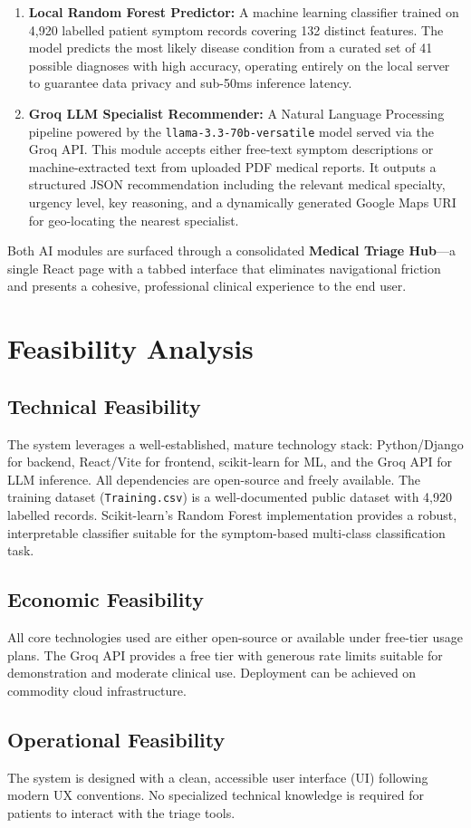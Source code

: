 \begin{enumerate}
    \item \textbf{Local Random Forest Predictor:} A machine learning classifier trained on 4,920 labelled patient symptom records covering 132 distinct features. The model predicts the most likely disease condition from a curated set of 41 possible diagnoses with high accuracy, operating entirely on the local server to guarantee data privacy and sub-50ms inference latency.

    \item \textbf{Groq LLM Specialist Recommender:} A Natural Language Processing pipeline powered by the \texttt{llama-3.3-70b-versatile} model served via the Groq API. This module accepts either free-text symptom descriptions or machine-extracted text from uploaded PDF medical reports. It outputs a structured JSON recommendation including the relevant medical specialty, urgency level, key reasoning, and a dynamically generated Google Maps URI for geo-locating the nearest specialist.
\end{enumerate}

Both AI modules are surfaced through a consolidated \textbf{Medical Triage Hub}---a single React page with a tabbed interface that eliminates navigational friction and presents a cohesive, professional clinical experience to the end user.

\section{Feasibility Analysis}

\subsection{Technical Feasibility}
The system leverages a well-established, mature technology stack: Python/Django for backend, React/Vite for frontend, scikit-learn for ML, and the Groq API for LLM inference. All dependencies are open-source and freely available. The training dataset (\texttt{Training.csv}) is a well-documented public dataset with 4,920 labelled records. Scikit-learn's Random Forest implementation provides a robust, interpretable classifier suitable for the symptom-based multi-class classification task.

\subsection{Economic Feasibility}
All core technologies used are either open-source or available under free-tier usage plans. The Groq API provides a free tier with generous rate limits suitable for demonstration and moderate clinical use. Deployment can be achieved on commodity cloud infrastructure.

\subsection{Operational Feasibility}
The system is designed with a clean, accessible user interface (UI) following modern UX conventions. No specialized technical knowledge is required for patients to interact with the triage tools.
